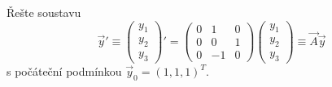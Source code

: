 \begin{ex}
   Řešte soustavu
   \[
      \vec{y}'\equiv
      \begin{pmatrix}
         y_1\\y_2\\y_3
      \end{pmatrix}'
      =
      \begin{pmatrix}
         0 & 1 & 0\\ 0 & 0 & 1\\ 0 & -1 & 0
      \end{pmatrix}
      \begin{pmatrix}
         y_1\\y_2\\y_3
      \end{pmatrix}
      \equiv \vec{A}\vec{y}
   \]
   s počáteční podmínkou $\vec{y}_0=(1,1,1)^T$.
\end{ex}
